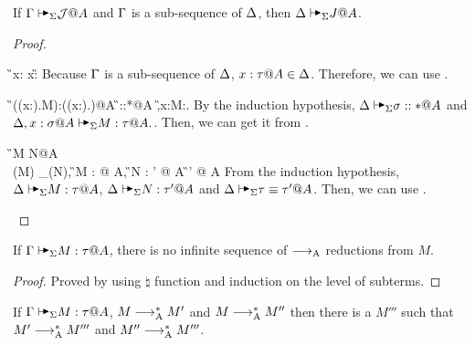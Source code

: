
\begin{lemma}
    \label{lemma:AlgorithmicWeakening}
    If \(\G \AVS \mathcal{J}@A\) and \(\Gamma\) is a sub-sequence of \(\Delta\), then \(\D \AVS J@A\).
\end{lemma}

\begin{proof}
    \begin{rneqncase}{\TAVar}{
        \G \AVS x:\tau@A
        x:\tau@A \in \G
        }
        Because \( \Gamma \) is a sub-sequence of \( \Delta \), \( x:\tau@A \in \D \).
        Therefore, we can use \TAVar.
    \end{rneqncase}
    \begin{rneqncase}{\TAAbs}{
            \G\AVS(\lambda (x:\sigma).M):(\Pi (x:\sigma).\tau)@A
            \G\AVS \sigma::*@A 
            \G,x:\sigma@A\AVS M:\tau@A.
        }
        By the induction hypothesis, \( \D \AVS \sigma::*@A \) and \(
        \D,x:\sigma@A\AVS M:\tau@A. \). Then, we can get it from \TAAbs.
    \end{rneqncase}
    \begin{rneqncase}{\QAANF}{
            \G \AVS M \E N@A
             \\
            \ANF(M) \E_\alpha \ANF(N),
            \G \AVS M : \tau @ A,
            \G \AVS N : \tau' @ A 
            \G \AVS \tau \E \tau' @ A
        }
        From the induction hypothesis, \( \D \AVS M : \tau @ A \), \( \D \AVS N
        : \tau' @ A \) and \( \D \AVS \tau \E \tau' @ A \). Then, we can use \QAANF.
    \end{rneqncase}
\end{proof}

\begin{lemma}
    \label{lemma:StrongNormalizationofAlgorithmicReduction}
    If \( \G \AVS M :\tau @ A\), there is no infinite sequence of \( \longrightarrow_{\text{A}} \) reductions from \( M \).
\end{lemma}

\begin{proof}
    Proved by using \( \natural \) function and induction on the level of subterms.
\end{proof}

\begin{lemma}
    \label{lemma:ConfluenceofAlgorithmicReduction}
    If \( \G \AVS M :\tau @ A\), \( M \longrightarrow_{\text{A}}^* M' \) and \(M \longrightarrow_{\text{A}}^* M''\)
    then there is a \( M''' \) such that \( M' \longrightarrow_{\text{A}}^* M''' \) and \( M'' \longrightarrow_{\text{A}}^* M''' \).
\end{lemma}

